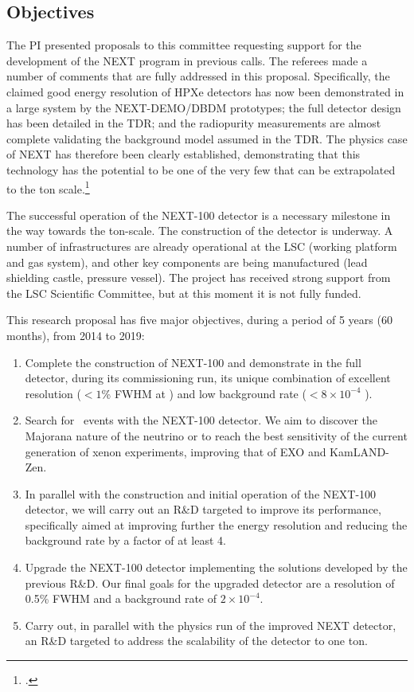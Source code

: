 \subsection*{Objectives}

The PI presented proposals to this committee requesting support for the development of the NEXT program in previous calls. The referees made a number of comments that are fully addressed in this proposal.  Specifically, the claimed good energy resolution of HPXe detectors has now been demonstrated in a large system by the NEXT-DEMO/DBDM prototypes; the full detector design has been detailed in the TDR; and the radiopurity measurements are almost complete validating the background model assumed in the TDR.  The physics case of NEXT has therefore been clearly established, demonstrating that this technology has the potential to be one of the very few that can be extrapolated to the ton scale.\footcite{GomezCadenas:2012jv} 

The successful operation of the NEXT-100 detector is a necessary milestone in the way towards the ton-scale. The construction of the detector is underway. A number of infrastructures are already operational at the LSC (working platform and gas system), and other key components are being manufactured (lead shielding castle, pressure vessel). The project has received strong support from the LSC Scientific Committee, but at this moment it is not fully funded. 

This research proposal has five major objectives, during a period of 5 years (60 months), from 2014 to 2019:
\begin{enumerate}
\item Complete the construction of NEXT-100 and demonstrate in the full detector, during its commissioning run, its unique combination of excellent resolution ($<1$\% FWHM at \Qbb) and low background rate ($<8 \times 10^{-4}$ \ckky).
%
\item Search for \bbonu\ events with the NEXT-100 detector. We aim to discover the Majorana nature of the neutrino or to reach the best sensitivity of the current generation of xenon experiments, improving that of EXO and KamLAND-Zen.
%
\item In parallel with the construction and initial operation of the NEXT-100 detector, we will carry out an R\&D targeted to improve its performance, specifically aimed at improving further the energy resolution and reducing the background rate by a factor of at least 4. 
%
\item Upgrade the NEXT-100 detector implementing the solutions developed by the previous R\&D. Our final goals for the upgraded detector are a resolution of 0.5\% FWHM and a background rate of $2 \times 10^{-4}$\ckky. 
%
\item Carry out, in parallel with the physics run of the improved NEXT detector, an R\&D targeted to address the scalability of the detector to one ton.
\end{enumerate}

